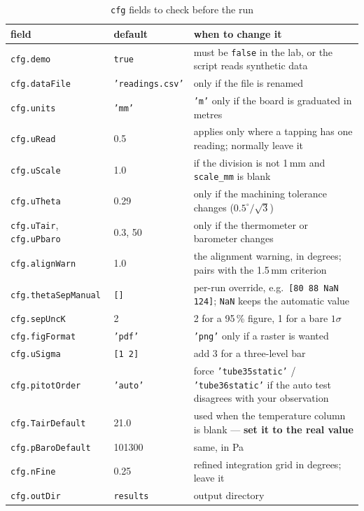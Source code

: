 \documentclass[11pt,a4paper]{article}
\begin{document}
\begin{table}[H]
\centering
\caption{\texttt{cfg} fields to check before the run}
\small
\begin{tabularx}{\textwidth}{@{}p{3.6cm} p{2.7cm} X@{}}
\toprule
field & default & when to change it \\
\midrule
\texttt{cfg.demo} & \texttt{true} & must be \texttt{false} in the lab, or the script reads synthetic data \\
\texttt{cfg.dataFile} & \texttt{'readings.csv'} & only if the file is renamed \\
\texttt{cfg.units} & \texttt{'mm'} & \texttt{'m'} only if the board is graduated in metres \\
\texttt{cfg.uRead} & 0.5 & applies only where a tapping has one reading; normally leave it \\
\texttt{cfg.uScale} & 1.0 & if the division is not 1\,mm and \texttt{scale\_mm} is blank \\
\texttt{cfg.uTheta} & 0.29 & only if the machining tolerance changes ($0.5^\circ/\sqrt{3}$) \\
\texttt{cfg.uTair}, \texttt{cfg.uPbaro} & 0.3, 50 & only if the thermometer or barometer changes \\
\texttt{cfg.alignWarn} & 1.0 & the alignment warning, in degrees; pairs with the 1.5\,mm criterion \\
\texttt{cfg.thetaSepManual} & \texttt{[]} & per-run override, e.g.\ \texttt{[80 88 NaN 124]}; \texttt{NaN} keeps the automatic value \\
\texttt{cfg.sepUncK} & 2 & 2 for a 95\,\% figure, 1 for a bare $1\sigma$ \\
\texttt{cfg.figFormat} & \texttt{'pdf'} & \texttt{'png'} only if a raster is wanted \\
\texttt{cfg.uSigma} & \texttt{[1 2]} & add 3 for a three-level bar \\
\texttt{cfg.pitotOrder} & \texttt{'auto'} & force \texttt{'tube35static'} / \texttt{'tube36static'} if the auto test disagrees with your observation \\
\texttt{cfg.TairDefault} & 21.0 & used when the temperature column is blank --- \textbf{set it to the real value} \\
\texttt{cfg.pBaroDefault} & 101300 & same, in Pa \\
\texttt{cfg.nFine} & 0.25 & refined integration grid in degrees; leave it \\
\texttt{cfg.outDir} & \texttt{results} & output directory \\
\bottomrule
\end{tabularx}
\end{table}
\end{document}
